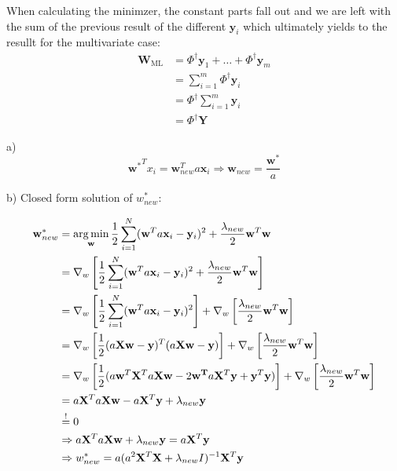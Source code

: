 When calculating the minimzer, the constant parts fall out and we are left with the sum of the previous result of the different $\mathbf{y}_i$ which ultimately yields to the resullt for the multivariate case:
\begin{align*}
  \mathbf{W}_\text{ML} &= \Phi^\dagger \mathbf{y}_1 + \ldots + \Phi^\dagger \mathbf{y}_m \\
  &= \sum_{i=1}^m \Phi^\dagger \mathbf{y}_i \\
  &= \Phi^\dagger \sum_{i=1}^m \mathbf{y}_i \\
  &= \Phi^\dagger \mathbf{Y}
\end{align*}
%
%
%
\begin{flushleft}
a) 
\[ {\mathbf{w}^*}^T x_i = \mathbf{w}^T_{new} a \mathbf{x}_i \Rightarrow \mathbf{w}_{new} = \frac{\mathbf{w}^*}{a} \]
\end{flushleft}
\begin{flushleft}
b) Closed form solution of $w_{new}^*$:
\end{flushleft}
\begin{align*}
  \mathbf{w}_{new}^* &= \operatorname*{arg\,min}_\mathbf{w} \frac{1}{2} \sum_{i=1}^N (\mathbf{w}^T a \mathbf{x}_i - \mathbf{y}_i)^2 + \frac{\lambda_{new}}{2} \mathbf{w}^T \mathbf{w} \\
  &= \nabla_w \left[ \frac{1}{2} \sum_{i=1}^N (\mathbf{w}^T a \mathbf{x}_i - \mathbf{y}_i)^2 + \frac{\lambda_{new}}{2} \mathbf{w}^T \mathbf{w} \right] \\
  &= \nabla_w \left[ \frac{1}{2} \sum_{i=1}^N (\mathbf{w}^T a \mathbf{x}_i - \mathbf{y}_i)^2 \right] + \nabla_w \left[ \frac{\lambda_{new}}{2} \mathbf{w}^T \mathbf{w} \right]\\
  &= \nabla_w \left[ \frac{1}{2} (a \mathbf{X} \mathbf{w} - \mathbf{y})^T (a \mathbf{X} \mathbf{w} - \mathbf{y}) \right] + \nabla_w \left[ \frac{\lambda_{new}}{2} \mathbf{w}^T \mathbf{w} \right]\\
  &= \nabla_w \left[ \frac{1}{2} (a \mathbf{w}^T \mathbf{X}^T a \mathbf{X} \mathbf{w} - 2 \mathbf{w^T} a \mathbf{X}^T \mathbf{y} + \mathbf{y}^T \mathbf{y})\right] + \nabla_w \left[ \frac{\lambda_{new}}{2} \mathbf{w}^T \mathbf{w} \right]\\
  &= a \mathbf{X}^T a \mathbf{X} \mathbf{w}  - a \mathbf{X}^T \mathbf{y} + \lambda_{new} \mathbf{y} \\
  &\overset{!}{=} 0 \\
  &\Rightarrow a \mathbf{X}^T a \mathbf{X} \mathbf{w} + \lambda_{new} \mathbf{y} = a \mathbf{X}^T \mathbf{y} \\
  &\Rightarrow w_{new}^* = a (a^2 \mathbf{X}^T \mathbf{X} + \lambda_{new} I)^{-1} \mathbf{X}^T \mathbf{y}
\end{align*}
